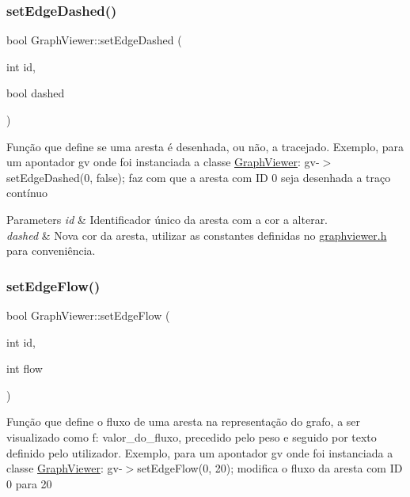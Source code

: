 \subsubsection{\texorpdfstring{set\+Edge\+Dashed()}{setEdgeDashed()}}
{\footnotesize\ttfamily bool Graph\+Viewer\+::set\+Edge\+Dashed (\begin{DoxyParamCaption}\item[{int}]{id,  }\item[{bool}]{dashed }\end{DoxyParamCaption})}

Função que define se uma aresta é desenhada, ou não, a tracejado. Exemplo, para um apontador gv onde foi instanciada a classe \mbox{\hyperlink{class_graph_viewer}{Graph\+Viewer}}\+: gv-\/$>$set\+Edge\+Dashed(0, false); faz com que a aresta com ID 0 seja desenhada a traço contínuo


\begin{DoxyParams}{Parameters}
{\em id} & Identificador único da aresta com a cor a alterar. \\
\hline
{\em dashed} & Nova cor da aresta, utilizar as constantes definidas no \mbox{\hyperlink{graphviewer_8h_source}{graphviewer.\+h}} para conveniência. \\
\hline
\end{DoxyParams}
\mbox{\label{class_graph_viewer_a69eb065145063e4dea41961e92e35c8e}} 
\subsubsection{\texorpdfstring{set\+Edge\+Flow()}{setEdgeFlow()}}
{\footnotesize\ttfamily bool Graph\+Viewer\+::set\+Edge\+Flow (\begin{DoxyParamCaption}\item[{int}]{id,  }\item[{int}]{flow }\end{DoxyParamCaption})}

Função que define o fluxo de uma aresta na representação do grafo, a ser visualizado como f\+: valor\+\_\+do\+\_\+fluxo, precedido pelo peso e seguido por texto definido pelo utilizador. Exemplo, para um apontador gv onde foi instanciada a classe \mbox{\hyperlink{class_graph_viewer}{Graph\+Viewer}}\+: gv-\/$>$set\+Edge\+Flow(0, 20); modifica o fluxo da aresta com ID 0 para 20


